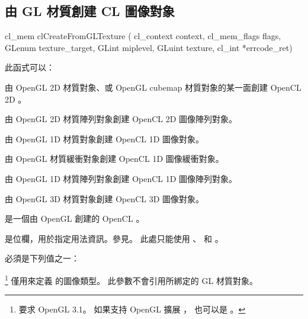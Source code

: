 \subsection{由 GL 材質創建 CL 圖像對象}


\startCLFUNC
cl_mem clCreateFromGLTexture (
			cl_context context,
			cl_mem_flags flags,
			GLenum texture_target,
			GLint miplevel,
			GLuint texture,
			cl_int *errcode_ret)
\stopCLFUNC

此函式可以：
\startigBase
\item 由 OpenGL 2D 材質對象、或 OpenGL cubemap 材質對象的某一面創建 OpenCL 2D 。

\item 由 OpenGL 2D 材質陣列對象創建 OpenCL 2D 圖像陣列對象。

\item 由 OpenGL 1D 材質對象創建 OpenCL 1D 圖像對象。

\item 由 OpenGL 材質緩衝對象創建 OpenCL 1D 圖像緩衝對象。

\item 由 OpenGL 1D 材質陣列對象創建 OpenCL 1D 圖像陣列對象。

\item 由 OpenGL 3D 材質對象創建 OpenCL 3D 圖像對象。
\stopigBase

 是一個由 OpenGL 創建的 OpenCL 。

 是位欄，用於指定用法資訊。參見。
此處只能使用 、  和 。

 必須是下列值之一：
\startigBase[indentnext=no]
\item {}
\item {}
\item {}
\item {}
\item {}
\item {}
\item {}
\item {}
\item {}
\item {}
\item {}
\item {}
\item {}\footnote{%
要求 OpenGL 3.1。
如果支持 OpenGL 擴展 ，
也可以是 。}
\stopigBase
{} 僅用來定義  的圖像類型。
此參數不會引用所綁定的 GL 材質對象。

